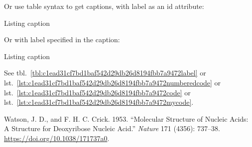 Or use table syntax to get captions, with label as an id attribute:

\begin{codelisting}

\caption{Listing
caption}\label{lst:c1ead31cf7bd1baf542d29db26d8194fbb7a9472mycode}

\begin{Shaded}
\begin{Highlighting}[]
 \NormalTok{ ()}
\OtherTok{=}  
\end{Highlighting}
\end{Shaded}

\end{codelisting}

Or with label specified in the caption:

\begin{codelisting}

\caption{Listing
caption}\label{lst:c1ead31cf7bd1baf542d29db26d8194fbb7a9472code}

\begin{Shaded}
\begin{Highlighting}[]
 \NormalTok{ ()}
\OtherTok{=}  
\end{Highlighting}
\end{Shaded}

\end{codelisting}

See tbl.~\ref{tbl:c1ead31cf7bd1baf542d29db26d8194fbb7a9472label} or
lst.~\ref{lst:c1ead31cf7bd1baf542d29db26d8194fbb7a9472numberedcode} or
lst.~\ref{lst:c1ead31cf7bd1baf542d29db26d8194fbb7a9472code} or
lst.~\ref{lst:c1ead31cf7bd1baf542d29db26d8194fbb7a9472mycode}.

\label{61879b5e0ffe4fbb0cb6788aa8462db5f9c333dbrefs}
\begin{CSLReferences}{1}{0}
Watson, J. D., and F. H. C. Crick. 1953. {``Molecular Structure of
Nucleic Acids: A Structure for Deoxyribose Nucleic Acid.''}
\emph{Nature} 171 (4356): 737--38.
\url{https://doi.org/10.1038/171737a0}.

\end{CSLReferences}
